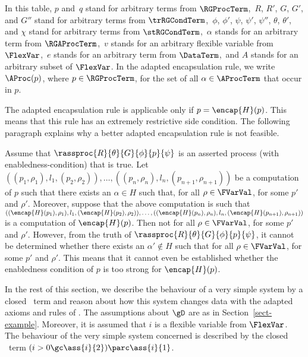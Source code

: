 \documentclass[runningheads]{llncs}
\begin{document}
%
In this table, $p$ and~$q$ stand for arbitrary terms from $\RGProcTerm$,\,
$R$, $R'$, $G$, $G'$, and $G''$ stand for arbitrary terms from 
$\trRGCondTerm$,\,
$\phi$, $\phi'$, $\psi$, $\psi'$, $\psi''$, $\theta$, $\theta'$, and 
$\chi$ stand for arbitrary terms from $\stRGCondTerm$,\,
$\alpha$ stands for an arbitrary term from $\RGAProcTerm$,\,
$v$ stands for an arbitrary flexible variable from $\FlexVar$,\,
$e$ stands for an arbitrary term from $\DataTerm$,\, and
$A$ stands for an arbitrary subset of $\FlexVar$.
%
In the adapted encapsulation rule, we write $\AProc(p)$, where 
$p \in \RGProcTerm$, for the set of all $\alpha \in \AProcTerm$ that 
occur in $p$.

The adapted encapsulation rule is applicable only if $p = \encap{H}(p)$.
This means that this rule has an extremely restrictive side condition.
The following paragraph explains why a better adapted encapsulation rule 
is not feasible.

Assume that $\rassproc{R}{\theta}{G}{\phi}{p}{\psi}$ is an asserted 
process (with enabledness-condition) that is true.
Let 
$((p_1,\rho_1), l_1, (p_2,\rho_2)), \ldots, 
 ((p_n,\rho_n), l_n, (p_{n+1},\rho_{n+1}))$ 
be a computation of $p$ such that 
there exists an $\alpha \in H$ such that, 
for all \mbox{$\rho \in \FVarVal$},
for some $p'$ and $\rho'$.
Moreover, \mbox{suppose} that the above computation is such that
$((\encap{H}(p_1),\rho_1), l_1, (\encap{H}(p_2),\rho_2)), \ldots,
 \linebreak[2]
 ((\encap{H}(p_n),\rho_n), l_n, (\encap{H}(p_{n+1}),\rho_{n+1}))$
is a computation of $\encap{H}(p)$.
Then
not for all $\rho \in \FVarVal$,
for some $p'$ and $\rho'$.  
However, from the truth of 
$\rassproc{R}{\theta}{G}{\phi}{p}{\psi}$, 
it cannot be determined whether there exists an $\alpha' \notin H$ such 
that 
for all $\rho \in \FVarVal$,
for some $p'$ and $\rho'$. 
This means that it cannot even be established whether the enabledness 
condition of $p$ is too strong for $\encap{H}(p)$.

In the rest of this section, we describe the behaviour of a very simple 
system by a closed \deACPei\ term and reason about how this system 
changes data with the adapted axioms and rules of \RG.
The assumptions about $\gD$ are as in Section~\ref{sect-example}.
Moreover, it is assumed that $i$ is a flexible variable from $\FlexVar$.
%
The behaviour of the very simple system concerned is described by the 
closed \deACPei\ \linebreak[2] term 
$(i > 0 \gc \ass{i}{2}) \parc \ass{i}{1}$. 
\end{document}
